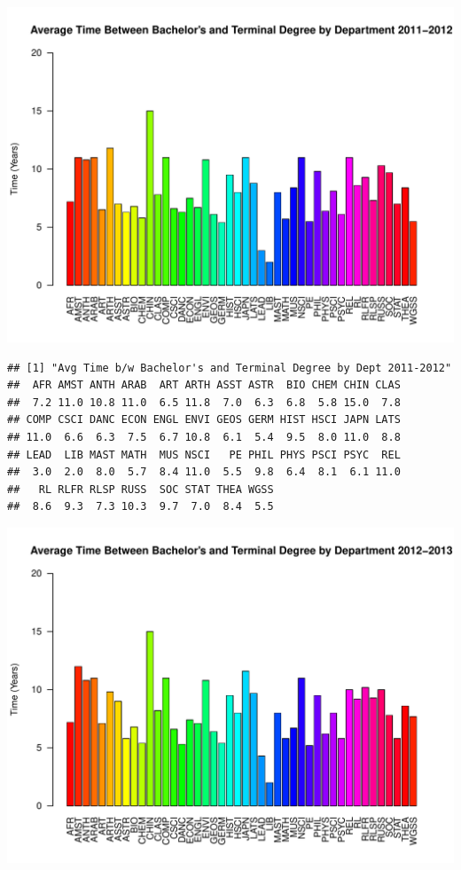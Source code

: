 \documentclass[12pt,a4paper]{article}\usepackage[]{graphicx}\usepackage[]{color}
\makeatletter
\def\maxwidth{ %
  \ifdim\Gin@nat@width>\linewidth
    \linewidth
  \else
    \Gin@nat@width
  \fi
}
\newenvironment{kframe}{%
 \def\at@end@of@kframe{}%
 \ifinner\ifhmode%
  \def\at@end@of@kframe{\end{minipage}}%
  \begin{minipage}{\columnwidth}%
 \fi\fi%
 \def\FrameCommand##1{\hskip\@totalleftmargin \hskip-\fboxsep
 \colorbox{shadecolor}{##1}\hskip-\fboxsep
     \hskip-\linewidth \hskip-\@totalleftmargin \hskip\columnwidth}%
 \MakeFramed {\advance\hsize-\width
   \@totalleftmargin\z@ \linewidth\hsize
   \@setminipage}}%
 {\par\unskip\endMakeFramed%
 \at@end@of@kframe}
\newenvironment{knitrout}{}{} %
\theoremstyle{definition}
\makeatother
\begin{document}
\begin{knitrout}
\includegraphics[width=\maxwidth]{figure/unnamed-chunk-12-8} 
\begin{kframe}\begin{verbatim}
## [1] "Avg Time b/w Bachelor's and Terminal Degree by Dept 2011-2012"
##  AFR AMST ANTH ARAB  ART ARTH ASST ASTR  BIO CHEM CHIN CLAS 
##  7.2 11.0 10.8 11.0  6.5 11.8  7.0  6.3  6.8  5.8 15.0  7.8 
## COMP CSCI DANC ECON ENGL ENVI GEOS GERM HIST HSCI JAPN LATS 
## 11.0  6.6  6.3  7.5  6.7 10.8  6.1  5.4  9.5  8.0 11.0  8.8 
## LEAD  LIB MAST MATH  MUS NSCI   PE PHIL PHYS PSCI PSYC  REL 
##  3.0  2.0  8.0  5.7  8.4 11.0  5.5  9.8  6.4  8.1  6.1 11.0 
##   RL RLFR RLSP RUSS  SOC STAT THEA WGSS 
##  8.6  9.3  7.3 10.3  9.7  7.0  8.4  5.5
\end{verbatim}
\end{kframe}
\includegraphics[width=\maxwidth]{figure/unnamed-chunk-12-9} 

\end{knitrout}
\end{document}
